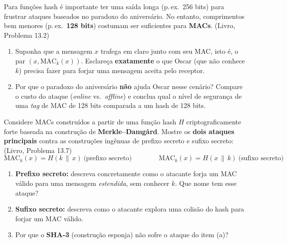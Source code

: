 \documentclass[11pt,a4paper]{article}
\newcommand{\livro}[1]{{\footnotesize\color{black!50}(Livro, Problema #1)}}
\begin{document}
\begin{exercicio}
Para fun\c{c}\~{o}es hash \'{e} importante ter uma sa\'{i}da longa (p.\,ex.\ 256 bits) para frustrar ataques baseados no paradoxo do anivers\'{a}rio. No entanto, comprimentos bem menores (p.\,ex.\ \textbf{128 bits}) costumam ser suficientes para \textbf{MACs}. \livro{13.2}
\begin{enumerate}[label=(\alph*)]
    \item Suponha que a mensagem $x$ trafega em claro junto com seu MAC, isto \'{e}, o par $(x, \text{MAC}_k(x))$. Esclare\c{c}a \textbf{exatamente} o que Oscar (que n\~{a}o conhece $k$) precisa fazer para forjar uma mensagem aceita pelo receptor.
    \item Por que o paradoxo do anivers\'{a}rio \textbf{n\~{a}o} ajuda Oscar nesse cen\'{a}rio? Compare o custo do ataque (\emph{online} vs.\ \emph{offline}) e conclua qual o n\'{i}vel de seguran\c{c}a de uma \textit{tag} de MAC de 128 bits comparada a um hash de 128 bits.
\end{enumerate}
\end{exercicio}

\begin{exercicio}
Considere MACs constru\'{i}dos a partir de uma fun\c{c}\~{a}o hash $H$ criptograficamente forte baseada na constru\c{c}\~{a}o de \textbf{Merkle--Damg\r{a}rd}. Mostre os \textbf{dois ataques principais} contra as constru\c{c}\~{o}es ing\^{e}nuas de prefixo secreto e sufixo secreto: \livro{13.7}
\[
    \text{MAC}_k(x) = H(k \,\|\, x) \ \text{(prefixo secreto)}
    \qquad\qquad
    \text{MAC}_k(x) = H(x \,\|\, k) \ \text{(sufixo secreto)}
\]
\begin{enumerate}[label=(\alph*)]
    \item \textbf{Prefixo secreto:} descreva concretamente como o atacante forja um MAC v\'{a}lido para uma mensagem \emph{estendida}, sem conhecer $k$. Que nome tem esse ataque?
    \item \textbf{Sufixo secreto:} descreva como o atacante explora uma colis\~{a}o do hash para forjar um MAC v\'{a}lido.
    \item Por que o \textbf{SHA-3} (constru\c{c}\~{a}o esponja) n\~{a}o sofre o ataque do item (a)?
\end{enumerate}
\end{exercicio}
\end{document}
